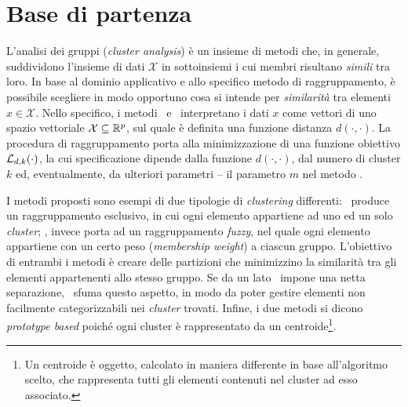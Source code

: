 \documentclass[runningheads]{llncs}
\begin{document}
\section{Base di partenza}\label{cap:base_di_partenza}
L'analisi dei gruppi (\textit{cluster analysis}) è un insieme di metodi che, in generale, suddividono l'insieme di dati $\mathcal{X}$ in sottoinsiemi i cui membri risultano \textit{simili} tra loro.
In base al dominio applicativo e allo specifico metodo di raggruppamento, è possibile scegliere in modo opportuno cosa si intende per \textit{similarità} tra elementi $x \in \mathcal{X}$.
Nello specifico, i metodi \km\ e \fcm\ interpretano i dati $x$ come vettori di uno spazio vettoriale $\mathcal{X} \subseteq \mathbb{R}^{p}$, sul quale è definita una funzione distanza $d(\cdot , \cdot)$.
La procedura di raggruppamento porta alla minimizzazione di una funzione obiettivo $ \mathcal{L}_{d,k}(\cdot )$, la cui specificazione dipende dalla funzione $d(\cdot , \cdot )$, dal numero di cluster $k$ ed, eventualmente, da ulteriori parametri -- il parametro $m$ nel metodo \fcm.

I metodi proposti sono esempi di due tipologie di \textit{clustering} differenti:
\km\ produce un raggruppamento esclusivo, in cui ogni elemento appartiene ad uno ed un solo \textit{cluster}; \fcm, invece porta ad un raggruppamento \textit{fuzzy}, nel quale ogni elemento appartiene con un certo peso (\emph{membership weight}) a ciascun gruppo.
L'obiettivo di entrambi i metodi è creare delle partizioni che minimizzino la similarità tra gli elementi appartenenti allo stesso gruppo.
Se da un lato \km\ impone una netta separazione, \fcm\ sfuma questo aspetto, in modo da poter gestire elementi non facilmente categorizzabili nei \textit{cluster} trovati.
Infine, i due metodi si dicono \emph{prototype based} poiché ogni cluster è rappresentato da un centroide\footnote{Un centroide è oggetto, calcolato in maniera differente in base all'algoritmo scelto, che rappresenta tutti gli elementi contenuti nel cluster ad esso associato.}.
\end{document}
